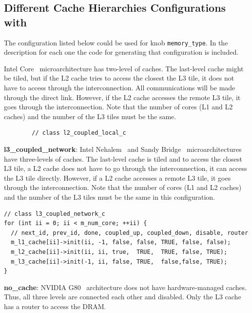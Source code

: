 \subsection{Different Cache Hierarchies Configurations with \SIM}
\label{sec:types_memory}
The configuration listed below could be used for knob \Verb+memory_type+.
In the description for each one the code for generating that configuration is
included.
\begin{itemize}
\ignore
		{
		\item Intel Core~\cite{core2duo} microarchitecture has two-level of
		caches. The last-level cache might be tiled, but if the L2 cache
		tries to access the closest the L3 tile, it does not have to access
		through the interconnection. All communications will be made through
		the direct link. However, if the L2 cache accesses the remote L3
		tile, it goes through the interconnection. Note that the number of
		cores (L1 and L2 caches) and the number of the L3 tiles must be the
		same.

		\smallskip
		\begin{lstlisting}
		// class l2_coupled_local_c
		\end{lstlisting}
		\smallskip
		 }

\item \textbf{l3\_coupled\_network}: Intel Nehalem~\cite{nehalem} and Sandy
    Bridge~\cite{sandybridge} microarchitectures have three-levels of
    caches. The last-level cache is tiled and to access the closest L3
    tile, a L2 cache does not have to go through the interconnection,
    it can access the L3 tile directly. However, if a L2 cache
    accesses a remote L3 tile, it goes through the interconnection.
    Note that the number of cores (L1 and L2 caches) and the number of
    the L3 tiles must be the same in this configuration.

\begin{Verbatim}
// class l3_coupled_network_c
for (int ii = 0; ii < m_num_core; ++ii) {
  // next_id, prev_id, done, coupled_up, coupled_down, disable, router
  m_l1_cache[ii]->init(ii, -1, false, false, TRUE, false, false);
  m_l2_cache[ii]->init(ii, ii, true,  TRUE,  TRUE, false, TRUE);
  m_l3_cache[ii]->init(-1, ii, false, TRUE,  false,false, TRUE);
}
\end{Verbatim}

  \item \textbf{no\_cache}: NVIDIA G80~\cite{g80} architecture does not have
  hardware-managed caches. Thus, all three levels are connected each
  other and disabled. Only the L3 cache has a router to access the DRAM.


\end{itemize}
